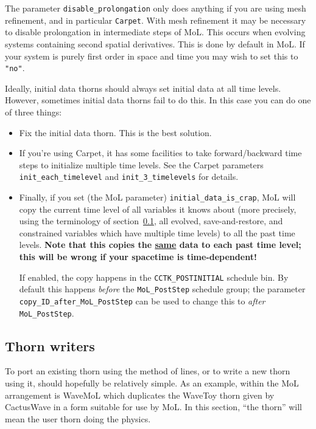 The parameter {\tt disable\_prolongation} only does anything if you
are using mesh refinement, and in particular {\tt Carpet}. With mesh
refinement it may be necessary to disable prolongation in intermediate
steps of MoL. This occurs when evolving systems containing second
spatial derivatives. This is done by default in MoL. If your system is
purely first order in space and time you may wish to set this to {\tt "no"}.

Ideally, initial data thorns should always set initial data at all time
levels.  However, sometimes initial data thorns fail to do this.  In
this case you can do one of three things:
\begin{itemize}
\item	Fix the initial data thorn.  This is the best solution.
\item	If you're using Carpet, it has some facilities to take
	forward/backward time steps to initialize multiple time
	levels.  See the Carpet parameters
	\verb|init_each_timelevel| and
	\verb|init_3_timelevels| for details.
\item	Finally, if you set (the MoL parameter) \verb|initial_data_is_crap|,
	MoL will copy the current time level of all variables it
	knows about (more precisely, using the terminology of
	section~\ref{CactusBase_MoL_sec:writeruse}, all evolved,
	save-and-restore, and constrained variables which have
	multiple time levels) to all the past time levels.
	\textbf{Note that this copies the \underline{same} data
	to each past time level; this will be wrong if your
	spacetime is time-dependent!}

	If enabled, the copy happens in the \verb|CCTK_POSTINITIAL|
	schedule bin.  By default this happens \emph{before}
	the \verb|MoL_PostStep| schedule group; the parameter
	\verb|copy_ID_after_MoL_PostStep| can be used to change
	this to \emph{after} \verb|MoL_PostStep|.
\end{itemize}


\subsection{Thorn writers}
\label{CactusBase_MoL_sec:writeruse}

To port an existing thorn using the method of lines, or to write a new
thorn using it, should hopefully be relatively simple. As an example,
within the MoL arrangement is WaveMoL which duplicates the WaveToy
thorn given by CactusWave in a form suitable for use by MoL. In this
section, ``the thorn'' will mean the user thorn doing the physics.

